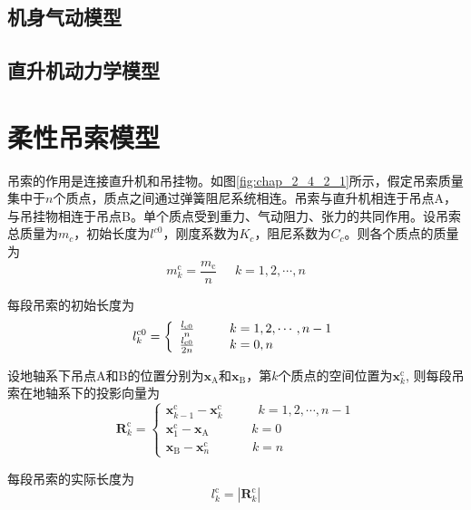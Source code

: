 \subsection{机身气动模型}
\subsection{直升机动力学模型}

\section{柔性吊索模型}
吊索的作用是连接直升机和吊挂物。如图\ref{fig:chap_2_4_2_1}所示，假定吊索质量集中于$n$个质点，质点之间通过弹簧阻尼系统相连。吊索与直升机相连于吊点A，与吊挂物相连于吊点B。单个质点受到重力、气动阻力、张力的共同作用。设吊索总质量为$m_c$，初始长度为$l^{c0}$，刚度系数为$K_c$，阻尼系数为$C_c$。则各个质点的质量为
\begin{equation}
  m_k^{\text{c}} = \frac{{{m_{\text{c}}}}}{n}\;\;\;\;\;k = 1,2, \cdots ,n
\end{equation}

每段吊索的初始长度为
\begin{equation}
  l_k^{{\rm{c0}}} = \left\{ \begin{array}{l}
    \frac{{{l_{{\rm{c}}0}}}}{n}\;\;\;\;\;\;\;\;\;\;k = 1,2, \cdots ,n - 1\\
    \frac{{{l_{{\rm{c}}0}}}}{{2n}}\;\;\;\;\;\;\;\;\;\;k = 0,n
    \end{array} \right.
\end{equation}

设地轴系下吊点A和B的位置分别为$\mathbf{x}_\text{A}$和$\mathbf{x}_\text{B}$，第$k$个质点的空间位置为$\mathbf{x}_k^{\text{c}}$, 则每段吊索在地轴系下的投影向量为
\begin{equation}
  \mathbf{R}_k^\text{c} = \left\{ \begin{array}{l}
    \mathbf{x}_{k-1}^{\text{c}} - \mathbf{x}_k^{\text{c}}\;\;\;\;\;\;\;\;\;\;k = 1,2, \cdots ,n - 1\\
    \mathbf{x}_{1}^{\text{c}} - \mathbf{x}_{\text{A}}\;\;\;\;\;\;\;\;\;\;\;\;k = 0\\
    \mathbf{x}_{\text{B}} - \mathbf{x}_{n}^{\text{c}}\;\;\;\;\;\;\;\;\;\;\;\;k = n
    \end{array} \right.
\end{equation}

每段吊索的实际长度为
\begin{equation}
  l_k^{\text{c}} = \left| {{\mathbf{R}}_k^{\text{c}}} \right|
\end{equation}

